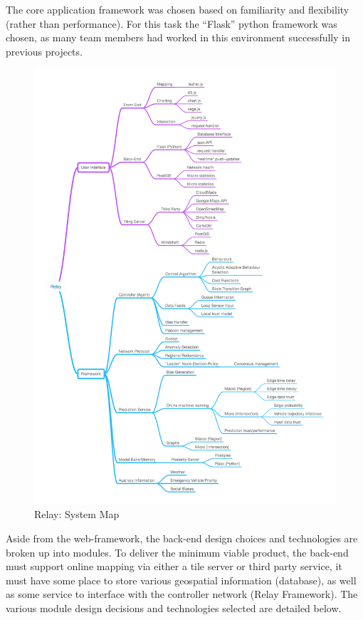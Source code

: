 \documentclass{article}
\begin{document}
The core application framework was chosen based on familiarity and flexibility (rather than performance).
For this task the ``Flask'' python framework was chosen, as many team members had worked in this environment successfully in previous projects.\\

\begin{figure}[htbp!]
  \begin{centering}
    \includegraphics[scale=0.3]{figures/flow-chart.png}
    \caption{Relay: System Map}
    \label{fig:Back_end_system_map}
  \end{centering}
\end{figure}

Aside from the web-framework, the back-end design choices and technologies are broken up into modules.
To deliver the minimum viable product, the back-end must support online mapping via either a tile server or third party service, it must have some place to store various geospatial information (database), as well as some service to interface with the controller network (Relay Framework).
The various module design decisions and technologies selected are detailed below.\\
\end{document}
